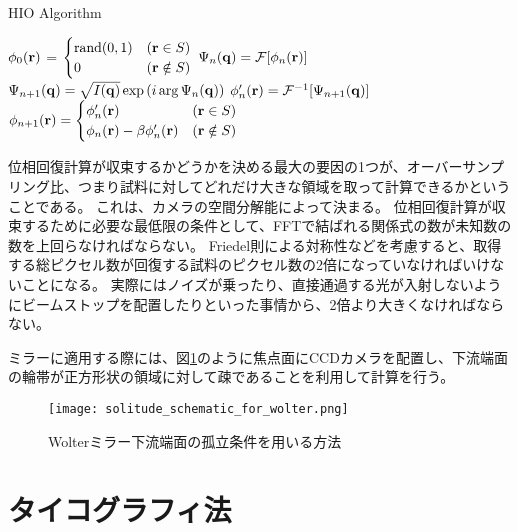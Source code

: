 \begin{algorithm}                      
\caption{HIO Algorithm}         
\label{alg:hio}                          
\begin{algorithmic}
    \STATE $\phi_0(\mathbf{r})$
      = $\begin{cases}
        \mathrm{rand}(0,1) & (\mathbf{r} \in S) \\
        0 & (\mathbf{r} \notin S)
      \end{cases}$
    \STATE $\Psi_n(\mathbf{q}) = \mathcal F [\phi_n(\mathbf{r})]$
    \STATE $\Psi_{n+1}(\mathbf{q}) = \sqrt{I(\mathbf{q})} \exp \left( i \arg \Psi_n(\mathbf{q}) \right)$ 
    \STATE $\phi_n'(\mathbf{r}) = \mathcal F^{-1} [\Psi_{n+1}(\mathbf{q})]$
    \STATE $\phi_{n+1}(\mathbf{r})
      = \begin{cases}
          \phi_n'(\mathbf{r}) & (\mathbf{r} \in S) \\
          \phi_n(\mathbf{r}) - \beta \phi_n'(\mathbf{r}) & (\mathbf{r} \notin S)
      \end{cases}$
    \ENDFOR
\end{algorithmic}
\end{algorithm}

位相回復計算が収束するかどうかを決める最大の要因の1つが、オーバーサンプリング比、つまり試料に対してどれだけ大きな領域を取って計算できるかということである。
これは、カメラの空間分解能によって決まる。
位相回復計算が収束するために必要な最低限の条件として、FFTで結ばれる関係式の数が未知数の数を上回らなければならない。
Friedel則による対称性などを考慮すると、取得する総ピクセル数が回復する試料のピクセル数の2倍になっていなければいけないことになる。\cite{Latychevskaia2018}
実際にはノイズが乗ったり、直接通過する光が入射しないようにビームストップを配置したりといった事情から、2倍より大きくなければならない。

ミラーに適用する際には、図\ref{fig:solitude_schematic}のように焦点面にCCDカメラを配置し、下流端面の輪帯が正方形状の領域に対して疎であることを利用して計算を行う。

\begin{figure}[!ht]
\centering
\texttt{[image: solitude\_schematic\_for\_wolter.png]}
\caption{Wolterミラー下流端面の孤立条件を用いる方法}
\label{fig:solitude_schematic}
\end{figure}


\clearpage
\newpage

\section{タイコグラフィ法}
\label{chap3_ptychography_introduction}
